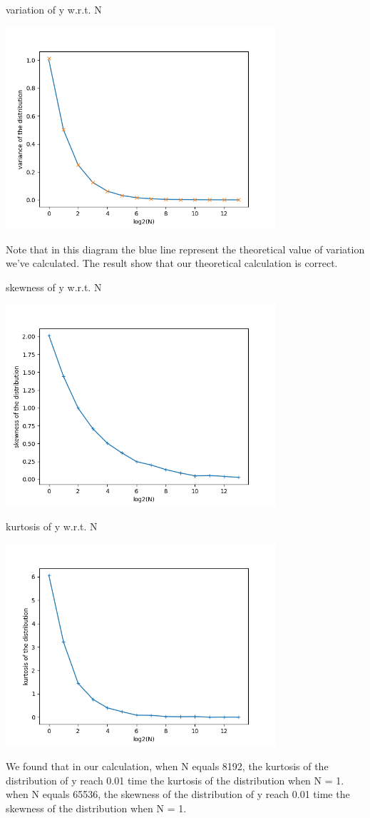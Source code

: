 \documentclass[letterpaper,12pt]{article}
\begin{document}
\begin{table}[!h]
    \centering
    \caption{variation of y w.r.t. N}
    \includegraphics[width=10cm]{ps3-4-22.png}
    \label{plot123}%
\end{table}%
\newpage
Note that in this diagram the blue line represent the theoretical value of variation we've calculated. The result show that our theoretical calculation is correct.
\newpage
\begin{table}[!h]
    \centering
    \caption{skewness of y w.r.t. N}
    \includegraphics[width=10cm]{ps3-4-23.png}
    \label{plot123}%
\end{table}%

\begin{table}[!h]
    \centering
    \caption{kurtosis of y w.r.t. N}
    \includegraphics[width=10cm]{ps3-4-24.png}
    \label{plot123}%
\end{table}%

We found that in our calculation, when N equals 8192, the kurtosis of the distribution of y reach 0.01 time the kurtosis of the distribution when N = 1.  when N equals 65536, the skewness of the distribution of y reach 0.01 time the skewness of the distribution when N = 1.  
\end{document}
